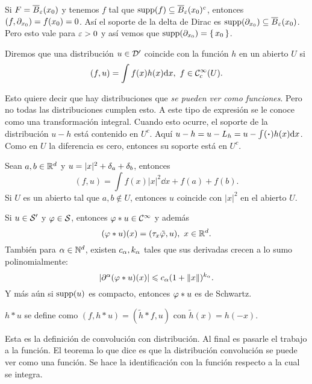 \documentclass[12pt]{memoir}
\begin{document}
\begin{Ex}
  Si $F=\overline B_\varepsilon(x_0)$ y tenemos $f$ tal que $\operatorname{supp}(f)\subseteq \overline{B}_\varepsilon(x_0)^c$, entonces $(f,\partial_{x_0})=f(x_0)=0$. Así el soporte de la delta de Dirac es $\operatorname{supp}(\partial_{x_0})\subseteq\overline B_\varepsilon(x_0)$. Pero esto vale para $\varepsilon>0$ y así vemos que $\operatorname{supp}(\partial_{x_0})=\{\,x_0\,\}$.
\end{Ex}

\begin{Def}
  Diremos que una distribución $u\in\mathcal{D}'$ coincide con la función $h$ en un abierto $U$ si 
  $$(f,u)=\int f(x)h(x)\dd x,\ f\in\Coo_c(U).$$
\end{Def}

Esto quiere decir que hay distribuciones que \emph{se pueden ver como funciones}. Pero no todas las distribuciones cumplen esto. A este tipo de expresión se le conoce como una transformación integral. Cuando esto ocurre, el soporte de la distribución $u-h$ está contenido en $U^c$. Aquí $u-h=u-L_h=u-\int(\.)h(x)\dd x$. Como en $U$ la diferencia es cero, entonces su soporte está en $U^c$.

\begin{Ex}
  Sean $a,b\in\mathbb{R}^d$ y $u=|x|^2+\delta_a+\delta_b$, entonces 
  $$(f,u)=\int f(x)|x|^2\dd x+f(a)+f(b).$$
  Si $U$ es un abierto tal que $a,b\not\in U$, entonces $u$ coincide con $|x|^2$ en el abierto $U$.
\end{Ex}

\begin{Th}
  Si $u\in\mathcal{S}'$ y $\varphi\in\mathcal{S}$, entonces $\varphi\ast u\in\mathcal{C}^\infty$ y además 
  $$(\vf\ast u)(x)=(\tau_x\tilde{\vf},u),\ x\in\bR^d.$$
  También para $\alpha\in\mathbb{N}^d$, existen $c_\alpha,k_\alpha$ tales que sus derivadas crecen a lo sumo polinomialmente:
  $$|\partial^\alpha(\varphi\ast u)(x)|\leqslant c_\alpha(1+\left\|x\right\|)^{k_\alpha}.$$
  Y más aún si $\operatorname{supp}(u)$ es compacto, entonces $\varphi\ast u$ es de Schwartz.
\end{Th}

\begin{Def}
  $h\ast u$ se define como $(f,h\ast u)=(\tilde{h}\ast f,u)$ con $\tilde{h}(x)=h(-x)$.
\end{Def}

Esta es la definición de convolución con distribución. Al final es pasarle el trabajo a la función. El teorema lo que dice es que la distribución convolución se puede ver como una función. Se hace la identificación con la función respecto a la cual se integra. 
\end{document}
